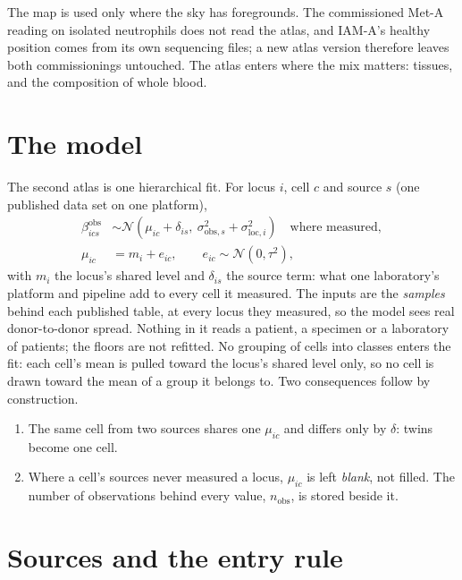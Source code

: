 The map is used only where the sky has foregrounds. The commissioned Met-A reading on isolated neutrophils does not read the atlas, and
IAM-A's healthy position comes from its own sequencing files; a new atlas version therefore leaves both commissionings untouched. The atlas
enters where the mix matters: tissues, and the composition of whole blood.

\section{The model}

The second atlas is one hierarchical fit. For locus $i$, cell $c$ and source $s$ (one published data set on one platform),
\begin{align}
  \beta^{\mathrm{obs}}_{ics}&\sim\mathcal N\!\left(\mu_{ic}+\delta_{is},\ \sigma^2_{\mathrm{obs},s}+\sigma^2_{\mathrm{loc},i}\right)\quad\text{where measured},\\
  \mu_{ic}&=m_i+e_{ic},\qquad e_{ic}\sim\mathcal N(0,\tau^2),
\end{align}
with $m_i$ the locus's shared level and $\delta_{is}$ the source term: what one laboratory's platform and pipeline add to every cell it
measured. The inputs are the \emph{samples} behind each published table, at every locus they measured, so the model sees real donor-to-donor
spread. Nothing in it reads a patient, a specimen or a laboratory of patients; the floors are not refitted. No grouping of cells into classes enters
the fit: each cell's mean is pulled toward the locus's shared level only, so no cell is drawn toward the mean of a group it
belongs to. Two consequences follow by construction.
\begin{enumerate}
\item The same cell from two sources shares one $\mu_{ic}$ and differs only by $\delta$: twins become one cell.
\item Where a cell's sources never measured a locus, $\mu_{ic}$ is left \emph{blank}, not filled. The number of observations behind every value,
      $n_{\mathrm{obs}}$, is stored beside it.
\end{enumerate}

\section{Sources and the entry rule}

